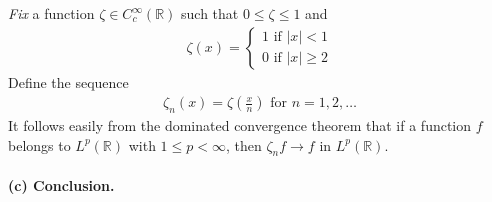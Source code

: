 \documentclass[a4paper,oneside]{book}
\numberwithin{equation}{chapter}
\begin{document}
\textit{Fix} a function $\zeta  \in C_c^\infty \left( \mathbb{R} \right)$ such that $0\le \zeta \le 1$ and
\begin{align}
\zeta \left( x \right) = \left\{ {\begin{array}{*{20}{c}}
{1\mbox{ if } \left| x \right| < 1}\\
{0\mbox{ if } \left| x \right| \ge 2}
\end{array}} \right.
\end{align}
Define the sequence
\begin{align}
{\zeta _n}\left( x \right) = \zeta \left( {\frac{x}{n}} \right)\mbox{ for } n = 1,2, \ldots 
\end{align}
It follows easily from the dominated convergence theorem that if a function $f$ belongs to $L^p\left(\mathbb{R}\right)$ with $1\le p<\infty$, then $\zeta _nf\to f$ in $L^p\left(\mathbb{R}\right)$.\\
\\
\textbf{(c) Conclusion.} 
\end{document}
